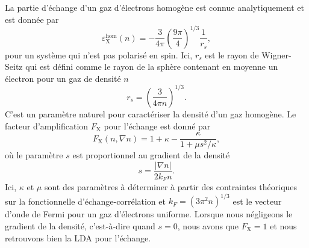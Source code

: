La partie d'échange d'un gaz d'électrons homogène est connue analytiquement et est donnée par~\cite{martinElectronicStructureBasic2004}
\begin{equation}
    \varepsilon_\text{X}^\text{hom}(n)=-\frac{3}{4\pi}\left(\frac{9\pi}{4}\right)^{1/3}\frac{1}{r_s},
    \label{eqn:a1_eX}
\end{equation}
pour un système qui n'est pas polarisé en spin. Ici, $r_s$ est le rayon de Wigner-Seitz qui est défini comme le rayon de la sphère contenant en moyenne un électron pour un gaz de densité $n$
\begin{equation}
    r_s = \left(\frac{3}{4\pi n}\right)^{1/3}.
    \label{eqn:a1_rs}
\end{equation}
C'est un paramètre naturel pour caractériser la densité d'un gaz homogène. Le facteur d'amplification $F_\text{X}$ pour l'échange est donné par
\begin{equation}
    F_\text{X}(n,\nabla n)=1+\kappa-\frac{\kappa}{1+\mu s^2/\kappa},
    \label{eqn:a1_FX}
\end{equation}
où le paramètre $s$ est proportionnel au gradient de la densité
\begin{equation}
    s=\frac{|\nabla n|}{2k_Fn}.
\end{equation}
Ici, $\kappa$ et $\mu$ sont des paramètres à déterminer à partir des contraintes théoriques sur la fonctionnelle d'échange-corrélation et $k_F=(3\pi^2n)^{1/3}$ est le vecteur d'onde de Fermi pour un gaz d'électrons uniforme. Lorsque nous négligeons le gradient de la densité, c'est-à-dire quand $s=0$, nous avons que $F_\text{X}=1$ et nous retrouvons bien la LDA pour l'échange.

